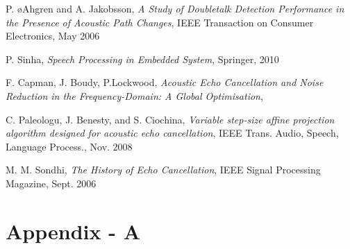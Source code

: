 \documentclass[a4paper,11pt,twoside]{article}
\begin{document}
\begin{thebibliography}{99}

P. \o{A}hgren and A. Jakobsson,
\emph{A Study of Doubletalk Detection Performance in the Presence of Acoustic Path Changes},
IEEE Transaction on Consumer Electronics,
May 2006

P. Sinha,
\emph{Speech Processing in Embedded System},
Springer, 
2010

F. Capman, J. Boudy, P.Lockwood,
\emph{Acoustic Echo Cancellation and Noise Reduction in the Frequency-Domain: A Global Optimisation},

C. Paleologu, J. Benesty, and S. Ciochina, 
\emph{Variable step-size affine projection algorithm designed for acoustic echo cancellation},
IEEE Trans. Audio, Speech, Language Process., 
Nov. 2008

M. M. Sondhi, 
\emph{The History of Echo Cancellation},
IEEE Signal Processing Magazine,
Sept. 2006
\end{thebibliography}

\newpage
\section{Appendix - A}

\end{document}
